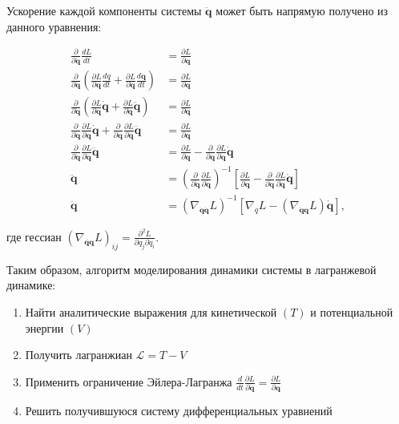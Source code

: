 \documentclass[12pt, twoside]{article}
\begin{document}
Ускорение каждой компоненты системы $ \ddot{\mathbf{q}}$ может быть напрямую получено из данного уравнения:

$$\begin{aligned} 
\frac{\partial}{\partial \dot{\mathbf{q}}} \frac{d L}{d t} 
&=\frac{\partial L}{\partial \mathbf{q}} \\ \frac{\partial}{\partial \dot{\mathbf{q}}}\left(\frac{\partial L}{\partial \mathbf{q}} \frac{d q}{d t}+\frac{\partial L}{\partial \dot{\mathbf{q}}} \frac{d \dot{\mathbf{q}}}{d t}\right) 
&=\frac{\partial L}{\partial \mathbf{q}} \\ \frac{\partial}{\partial \dot{\mathbf{q}}}\left(\frac{\partial L}{\partial \mathbf{q}} \dot{\mathbf{q}}+\frac{\partial L}{\partial \dot{\mathbf{q}}} \ddot{\mathbf{q}}\right) 
&=\frac{\partial L}{\partial \mathbf{q}} \\ \frac{\partial}{\partial \dot{\mathbf{q}}} \frac{\partial L}{\partial \mathbf{q}} \dot{\mathbf{q}}+\frac{\partial}{\partial \dot{\mathbf{q}}} \frac{\partial L}{\partial \dot{\mathbf{q}}} \ddot{\mathbf{q}} 
&=\frac{\partial L}{\partial \mathbf{q}} \\ \frac{\partial}{\partial \dot{\mathbf{q}}} \frac{\partial L}{\partial \dot{\mathbf{q}}} \ddot{\mathbf{q}} 
&=\frac{\partial L}{\partial \mathbf{q}}-\frac{\partial}{\partial \dot{\mathbf{q}}} \frac{\partial L}{\partial \mathbf{q}} \dot{\mathbf{q}} \\ \ddot{\mathbf{q}} 
&=\left(\frac{\partial}{\partial \dot{\mathbf{q}}} \frac{\partial L}{\partial \dot{\mathbf{q}}}\right)^{-1}\left[\frac{\partial L}{\partial \mathbf{q}}-\frac{\partial}{\partial \dot{\mathbf{q}}} \frac{\partial L}{\partial \mathbf{q}} \dot{\mathbf{q}}\right] \\ \ddot{\mathbf{q}} 
&=\left(\nabla_{\dot{\mathbf{q}} \dot{\mathbf{q}}} L\right)^{-1}\left[\nabla_{q} L-\left(\nabla_{\dot{\mathbf{q}}\mathbf{q}} L\right) \dot{\mathbf{q}}\right],
\end{aligned}$$

где гессиан $\left(\nabla_{\dot{\mathbf{q}\mathbf{q}}} L\right)_{i j}=\frac{\partial^{2} L}{\partial q_{j} \partial \dot{q}_{i}}$.

Таким образом, алгоритм моделирования динамики системы в лагранжевой динамике:
\begin{enumerate}
	\item Найти аналитические выражения для кинетической $(T)$ и потенциальной энергии $(V)$
	\item Получить лагранжиан $\mathcal{L} = T - V $
	\item Применить ограничение Эйлера-Лагранжа $\frac{d}{d t} \frac{\partial L}{\partial \mathbf{\dot{q}}} =\frac{\partial L}{\partial \mathbf{q}} $
	\item Решить получившуюся систему дифференциальных уравнений
\end{enumerate}
\end{document}

